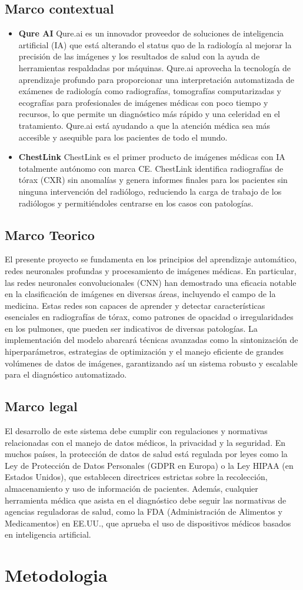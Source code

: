 \documentclass[conference]{IEEEtran}
\begin{document}
\subsection{Marco contextual}
\begin{itemize}
    \item \textbf{Qure AI} Qure.ai es un innovador proveedor de soluciones de inteligencia artificial (IA) que está alterando el status quo de la radiología al mejorar la precisión de las imágenes y los resultados de salud con la ayuda de herramientas respaldadas por máquinas. Qure.ai aprovecha la tecnología de aprendizaje profundo para proporcionar una interpretación automatizada de exámenes de radiología como radiografías, tomografías computarizadas y ecografías para profesionales de imágenes médicas con poco tiempo y recursos, lo que permite un diagnóstico más rápido y una celeridad en el tratamiento. Qure.ai está ayudando a que la atención médica sea más accesible y asequible para los pacientes de todo el mundo.
    \item \textbf{ChestLink} ChestLink es el primer producto de imágenes médicas con IA totalmente autónomo con marca CE. ChestLink identifica radiografías de tórax (CXR) sin anomalías y genera informes finales para los pacientes sin ninguna intervención del radiólogo, reduciendo la carga de trabajo de los radiólogos y permitiéndoles centrarse en los casos con patologías.
\end{itemize}
\subsection{Marco Teorico}
El presente proyecto se fundamenta en los principios del aprendizaje automático, redes neuronales profundas y procesamiento de imágenes médicas. En particular, las redes neuronales convolucionales (CNN) han demostrado una eficacia notable en la clasificación de imágenes en diversas áreas, incluyendo el campo de la medicina. Estas redes son capaces de aprender y detectar características esenciales en radiografías de tórax, como patrones de opacidad o irregularidades en los pulmones, que pueden ser indicativos de diversas patologías. La implementación del modelo abarcará técnicas avanzadas como la sintonización de hiperparámetros, estrategias de optimización y el manejo eficiente de grandes volúmenes de datos de imágenes, garantizando así un sistema robusto y escalable para el diagnóstico automatizado.
\subsection{Marco legal}
El desarrollo de este sistema debe cumplir con regulaciones y normativas relacionadas con el manejo de datos médicos, la privacidad y la seguridad. En muchos países, la protección de datos de salud está regulada por leyes como la Ley de Protección de Datos Personales (GDPR en Europa) o la Ley HIPAA (en Estados Unidos), que establecen directrices estrictas sobre la recolección, almacenamiento y uso de información de pacientes. Además, cualquier herramienta médica que asista en el diagnóstico debe seguir las normativas de agencias reguladoras de salud, como la FDA (Administración de Alimentos y Medicamentos) en EE.UU., que aprueba el uso de dispositivos médicos basados en inteligencia artificial.
\section{Metodologia}
\end{document}

